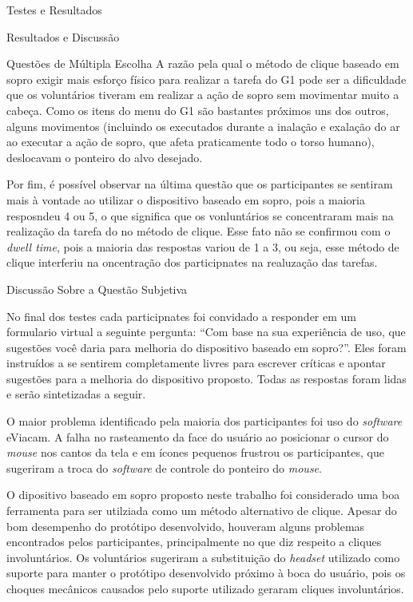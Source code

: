 \begin{chapter}{Testes e Resultados}
\begin{section}{Resultados e Discussão}
\begin{subsection}{Questões de Múltipla Escolha}
A razão pela qual o método de clique baseado em sopro exigir mais esforço físico
para realizar a tarefa do G1 pode ser a dificuldade que os voluntários tiveram
em realizar a ação de sopro sem movimentar muito a cabeça. Como os itens do menu
do G1 são bastantes próximos uns dos outros, alguns movimentos (incluindo os
executados durante a inalação e exalação do ar ao executar a ação de sopro, 
que afeta praticamente todo o torso humano), deslocavam o ponteiro do alvo
desejado.

Por fim, é possível observar na última questão que os participantes se sentiram
mais à vontade ao utilizar o dispositivo baseado em sopro, pois a maioria
resposndeu 4 ou 5, o que significa que os vonluntários se concentraram mais na
realização da tarefa do no método de clique. Esse fato não se confirmou com o
\textit{dwell time}, pois a maioria das respostas variou de 1 a 3, ou seja, esse
método de clique interferiu na oncentração dos participnates na realuzação das
tarefas. 

\end{subsection}

\begin{subsection}{Discussão Sobre a Questão Subjetiva}

No final dos testes cada participnates foi convidado a responder em um
formulario virtual a seguinte pergunta: ``Com base na sua experiência de uso,
que sugestões você daria para melhoria do dispositivo baseado em sopro?''. Eles 
foram instruídos a se sentirem completamente livres para escrever críticas e 
apontar sugestões para a melhoria do dispositivo proposto. Todas as respostas
foram lidas e serão sintetizadas a seguir.

O maior problema identificado pela maioria dos participantes foi uso do
\textit{software} eViacam. A falha no rasteamento da face do usuário ao
posicionar o cursor do \textit{mouse} nos cantos da tela e em ícones pequenos
frustrou os participantes, que sugeriram a troca do \textit{software} de
controle do ponteiro do \textit{mouse}.

O dipositivo baseado em sopro proposto neste trabalho foi considerado uma boa
ferramenta para ser utilziada como um método alternativo de clique. Apesar do
bom desempenho do protótipo desenvolvido, houveram alguns problemas encontrados
pelos participantes, principalmente no que diz respeito a cliques involuntários.
Os voluntários sugeriram a substituição do \textit{headset} utilizado como
suporte para manter o protótipo desenvolvido próximo à boca do usuário, pois os
choques mecânicos causados pelo suporte utilizado geraram cliques involuntários.


\end{subsection}
\end{section}
\end{chapter}
